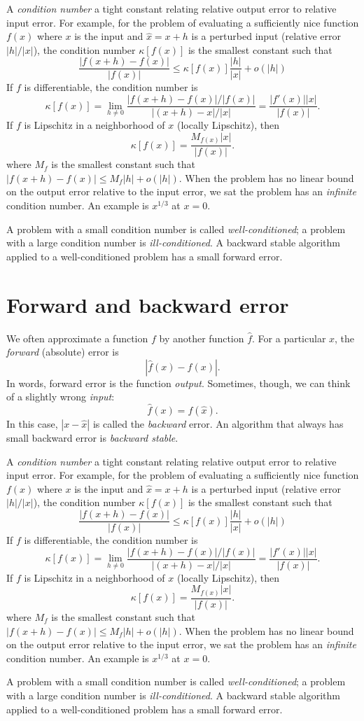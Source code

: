 \documentclass[12pt, leqno]{article} %
\begin{document}
A {\em condition number} a tight constant relating relative output
error to relative input error.  For example, for the problem of
evaluating a sufficiently nice function $f(x)$ where $x$ is the input
and $\hat{x} = x+h$ is a perturbed input (relative error $|h|/|x|$),
the condition number $\kappa[f(x)]$ is the smallest constant such that
\[
  \frac{|f(x+h)-f(x)|}{|f(x)|} \leq \kappa[f(x)] \frac{|h|}{|x|} + o(|h|)
\]
If $f$ is differentiable, the condition number is
\[
\kappa[f(x)] =
  \lim_{h \neq 0} \frac{|f(x+h)-f(x)|/|f(x)|}{|(x+h)-x|/|x|} =
  \frac{|f'(x)||x|}{|f(x)|}.
\]
If $f$ is Lipschitz in a neighborhood of $x$ (locally Lipschitz), then
\[
\kappa[f(x)] =
  \frac{M_{f(x)}|x|}{|f(x)|}.
\]
where $M_f$ is the smallest constant such that
$|f(x+h)-f(x)| \leq M_f |h| + o(|h|)$.  When the problem has no linear
bound on the output error relative to the input error, we sat the
problem has an {\em infinite} condition number.  An example is
$x^{1/3}$ at $x = 0$.

A problem with a small condition number is called {\em well-conditioned};
a problem with a large condition number is {\em ill-conditioned}.
A backward stable algorithm applied to a well-conditioned problem has
a small forward error.

\section{Forward and backward error}

We often approximate a function $f$ by another function $\hat{f}$.
For a particular $x$, the {\em forward} (absolute) error is
\[
  |\hat{f}(x)-f(x)|.
\]
In words, forward error is the function {\em output}.  Sometimes,
though, we can think of a slightly wrong {\em input}:
\[
  \hat{f}(x) = f(\hat{x}).
\]
In this case, $|x-\hat{x}|$ is called the {\em backward} error.
An algorithm that always has small backward error is {\em backward stable}.

A {\em condition number} a tight constant relating relative output
error to relative input error.  For example, for the problem of
evaluating a sufficiently nice function $f(x)$ where $x$ is the input
and $\hat{x} = x+h$ is a perturbed input (relative error $|h|/|x|$),
the condition number $\kappa[f(x)]$ is the smallest constant such that
\[
  \frac{|f(x+h)-f(x)|}{|f(x)|} \leq \kappa[f(x)] \frac{|h|}{|x|} + o(|h|)
\]
If $f$ is differentiable, the condition number is
\[
\kappa[f(x)] =
  \lim_{h \neq 0} \frac{|f(x+h)-f(x)|/|f(x)|}{|(x+h)-x|/|x|} =
  \frac{|f'(x)||x|}{|f(x)|}.
\]
If $f$ is Lipschitz in a neighborhood of $x$ (locally Lipschitz), then
\[
\kappa[f(x)] =
  \frac{M_{f(x)}|x|}{|f(x)|}.
\]
where $M_f$ is the smallest constant such that
$|f(x+h)-f(x)| \leq M_f |h| + o(|h|)$.  When the problem has no linear
bound on the output error relative to the input error, we sat the
problem has an {\em infinite} condition number.  An example is
$x^{1/3}$ at $x = 0$.

A problem with a small condition number is called {\em well-conditioned};
a problem with a large condition number is {\em ill-conditioned}.
A backward stable algorithm applied to a well-conditioned problem has
a small forward error.
\end{document}
